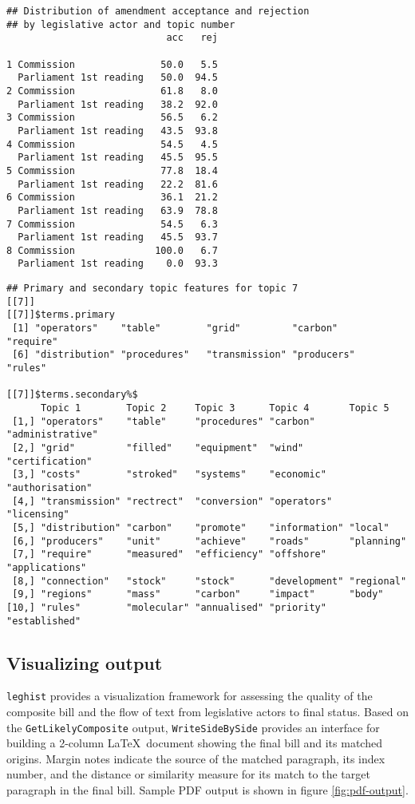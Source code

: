 \documentclass[11pt]{article}
\begin{document}
\newpage
\begin{verbatim}
## Distribution of amendment acceptance and rejection
## by legislative actor and topic number
                            acc   rej
                                     
1 Commission               50.0   5.5
  Parliament 1st reading   50.0  94.5
2 Commission               61.8   8.0
  Parliament 1st reading   38.2  92.0
3 Commission               56.5   6.2
  Parliament 1st reading   43.5  93.8
4 Commission               54.5   4.5
  Parliament 1st reading   45.5  95.5
5 Commission               77.8  18.4
  Parliament 1st reading   22.2  81.6
6 Commission               36.1  21.2
  Parliament 1st reading   63.9  78.8
7 Commission               54.5   6.3
  Parliament 1st reading   45.5  93.7
8 Commission              100.0   6.7
  Parliament 1st reading    0.0  93.3
\end{verbatim}

\begin{verbatim}
## Primary and secondary topic features for topic 7 
[[7]]
[[7]]$terms.primary
 [1] "operators"    "table"        "grid"         "carbon"       "require"     
 [6] "distribution" "procedures"   "transmission" "producers"    "rules"       

[[7]]$terms.secondary%$
      Topic 1        Topic 2     Topic 3      Topic 4       Topic 5         
 [1,] "operators"    "table"     "procedures" "carbon"      "administrative"
 [2,] "grid"         "filled"    "equipment"  "wind"        "certification" 
 [3,] "costs"        "stroked"   "systems"    "economic"    "authorisation" 
 [4,] "transmission" "rectrect"  "conversion" "operators"   "licensing"     
 [5,] "distribution" "carbon"    "promote"    "information" "local"         
 [6,] "producers"    "unit"      "achieve"    "roads"       "planning"      
 [7,] "require"      "measured"  "efficiency" "offshore"    "applications"  
 [8,] "connection"   "stock"     "stock"      "development" "regional"      
 [9,] "regions"      "mass"      "carbon"     "impact"      "body"          
[10,] "rules"        "molecular" "annualised" "priority"    "established" 
\end{verbatim}

\subsection{Visualizing output}
\label{sec:visu-proc-flow}

\texttt{leghist} provides a visualization framework for assessing
the quality of the composite bill and the flow of text from
legislative actors to final status. Based on the
\texttt{GetLikelyComposite} output, \texttt{WriteSideBySide} provides
an interface for building a 2-column \LaTeX\ document showing the final
bill and its matched origins. Margin notes indicate the source of the
matched paragraph, its index number, and the distance or similarity
measure for its match to the target paragraph in the final
bill. Sample PDF output is shown in figure \ref{fig:pdf-output}.
\end{document}
